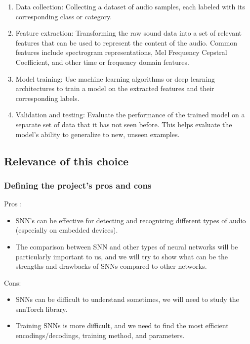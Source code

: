 \documentclass[11pt]{article}
\begin{document}
\begin{enumerate}
  \item Data collection: Collecting a dataset of audio samples, each labeled with its corresponding class or category.

  \item Feature extraction: Transforming the raw sound data into a set of relevant features that can be used to represent the content of the audio. Common features include spectrogram representations, Mel Frequency Cepstral Coefficient, and other time or frequency domain features.

  \item Model training: Use machine learning algorithms or deep learning architectures to train a model on the extracted features and their corresponding labels.

  \item Validation and testing: Evaluate the performance of the trained model on a separate set of data that it has not seen before. This helps evaluate the model's ability to generalize to new, unseen examples.
\end{enumerate}

\subsection{Relevance of this choice}
\subsubsection{Defining the project's pros and cons}
Pros :
\begin{itemize}
  \item SNN's can be effective for detecting and recognizing different types of audio (especially on embedded devices).
  \item The comparison between SNN and other types of neural networks will be particularly important to us, and we will try to show what can be the strengths and drawbacks of SNNs compared to other networks.
\end{itemize}

Cons:

\begin{itemize}
  \item SNNs can be difficult to understand sometimes, we will need to study the snnTorch library.
  \item Training SNNs is more difficult, and we need to find the most efficient encodings/decodings, training method, and parameters.
\end{itemize}
\end{document}
